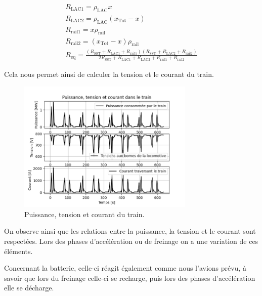 \documentclass[11pt, a4paper, oneside, portrait]{report}
\begin{document}
            \begin{gather*}
                R_{\text{LAC1}} = \rho_{\text{LAC}} x\\
                R_{\text{LAC2}} = \rho_{\text{LAC}} \left(x_{\text{Tot}}-x\right)\\
                R_\text{rail1} = x\rho_\text{rail}\\
                R_\text{rail2} = \left(x_\text{Tot}-x\right)\rho_\text{rail}\\
                R_\text{eq} = \frac{\left(R_\text{SST}+R_\text{LAC1}+R_\text{rail1}\right)\left(R_\text{SST}+R_\text{LAC2}+R_\text{rail2}\right)}{2R_\text{SST}+R_\text{LAC1}+R_\text{LAC2}+R_\text{rail1}+R_\text{rail2}}
            \end{gather*}

            Cela nous permet ainsi de calculer la tension et le courant du train.

            \begin{figure}[H]
                \centering
                \includegraphics[width=0.75\textwidth]{Figures/PTI.png}
                \caption{Puissance, tension et courant du train.}
                \label{fig:PTI}
            \end{figure}

            On observe ainsi que les relations entre la puissance, la tension et le courant sont respectées. Lors
            des phases d’accélération ou de freinage on a une variation de ces éléments.

            Concernant la batterie, celle-ci réagit également comme nous l’avions prévu, à savoir que lors du
            freinage celle-ci se recharge, puis lors des phases d’accélération elle se décharge.
\end{document}

